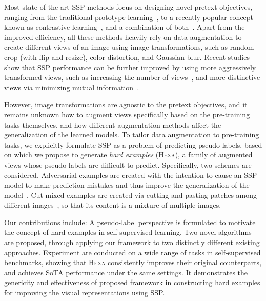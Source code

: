 \documentclass[10pt,twocolumn,letterpaper]{article}
\newcommand{\shortname}{\textsc{Hexa}}
\begin{document}
Most state-of-the-art SSP methods focus on designing novel pretext objectives, ranging from the traditional prototype learning~\cite{xie2016unsupervised,yang2016joint,caron2018deepcluster,ji2019invariant,zhan2020online}, to a recently popular concept known as contrastive learning~\cite{chen2020simple,he2020momentum,chen2020improved,grill2020bootstrap}, and a combination of both~\cite{caron2020unsupervised,li2020prototypical}. Apart from the improved efficiency, all these methods heavily rely on data augmentation to create different views of an image using image transformations, such as random crop (with flip and resize), color distortion, and Gaussian blur. Recent studies show that SSP performance can be further improved by using more aggressively transformed views, such as increasing the number of views~\cite{caron2020unsupervised}, and more distinctive views via minimizing mutual information~\cite{tian2020makes}.

However, image transformations are agnostic to the pretext objectives, and it remains unknown how to augment views specifically based on the pre-training tasks themselves, 
and how different augmentation methods affect the generalization of the learned models.
To tailor data augmentation to pre-training tasks,
we explicitly formulate SSP as a problem of predicting pseudo-labels, based on which we propose to generate {\em hard examples} (\shortname{}), 
a family of augmented views whose pseudo-labels are difficult to predict. 
Specifically, two schemes are considered. 
 Adversarial examples are created with the intention to cause an SSP model to make prediction mistakes and thus improve the generalization of the model~\cite{xie2020adversarial}.
 Cut-mixed examples are created via cutting and pasting patches among different images~\cite{yun2019cutmix}, so that its content is a mixture of multiple images.

Our contributions include:
 A pseudo-label perspective is formulated to motivate the concept of hard examples in self-supervised learning.
 Two novel algorithms are proposed, through applying our framework to two distinctly different existing approaches.
 Experiment are conducted on a wide range of tasks in self-supervised benchmarks, showing that  \shortname{}  consistently improves their original counterparts, and achieves SoTA performance under the same settings. It demonstrates the genericity and effectiveness of proposed framework in constructing hard examples for improving the visual representations using SSP.
\end{document}
